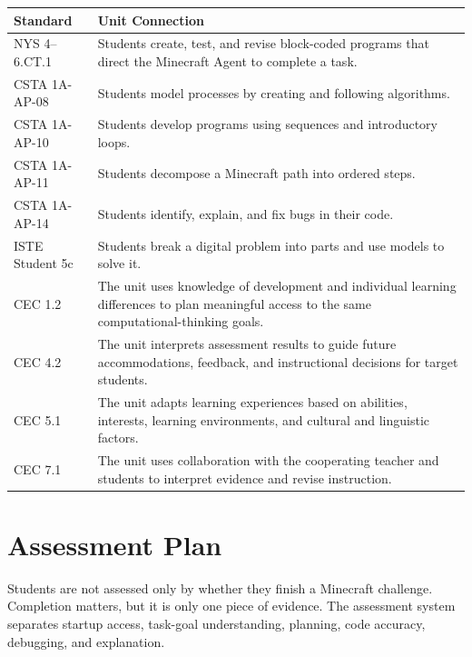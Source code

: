 \documentclass[12pt]{article}
\begin{document}
\begin{xltabular}{\textwidth}{|P{1.6in}|L|}
\hline
{}\color{white}\bfseries Standard & \color{white}\bfseries Unit Connection \\
\hline
NYS 4--6.CT.1 & Students create, test, and revise block-coded programs that direct the Minecraft Agent to complete a task. \\
\hline
{} CSTA 1A-AP-08 & Students model processes by creating and following algorithms. \\
\hline
CSTA 1A-AP-10 & Students develop programs using sequences and introductory loops. \\
\hline
{} CSTA 1A-AP-11 & Students decompose a Minecraft path into ordered steps. \\
\hline
CSTA 1A-AP-14 & Students identify, explain, and fix bugs in their code. \\
\hline
ISTE Student 5c & Students break a digital problem into parts and use models to solve it. \\
\hline
CEC 1.2 & The unit uses knowledge of development and individual learning differences to plan meaningful access to the same computational-thinking goals. \\
\hline
{} CEC 4.2 & The unit interprets assessment results to guide future accommodations, feedback, and instructional decisions for target students. \\
\hline
CEC 5.1 & The unit adapts learning experiences based on abilities, interests, learning environments, and cultural and linguistic factors. \\
\hline
CEC 7.1 & The unit uses collaboration with the cooperating teacher and students to interpret evidence and revise instruction. \\
\hline
\end{xltabular}

\section{Assessment Plan}

\begin{assessbox}
Students are not assessed only by whether they finish a Minecraft challenge. Completion matters, but it is only one piece of evidence. The assessment system separates startup access, task-goal understanding, planning, code accuracy, debugging, and explanation.
\end{assessbox}
\end{document}
